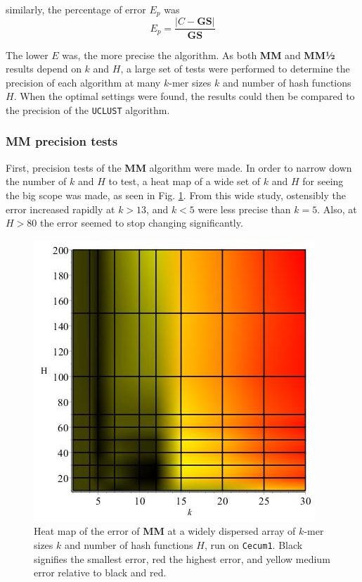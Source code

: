 \documentclass[../../main.tex]{subfiles}
\begin{document}
similarly, the percentage of error $E_p$ was 
\begin{equation}\label{eq:errorpercent}
E_p = \frac{|C - \mathbf{GS}|}{\mathbf{GS}}
\end{equation}


The lower $E$ was, the more precise the algorithm. As both {\bf MM} and {\bf MM½} results depend on $k$ and $H$, a large set of tests were performed to determine the precision of each algorithm at many $k$-mer sizes $k$ and number of hash functions $H$. When the optimal settings were found, the results could then be compared to the precision of the \texttt{UCLUST} algorithm. 
\subsubsection{MM precision tests}
First, precision tests of the {\bf MM} algorithm were made. In order to narrow down the number of $k$ and $H$ to test, a heat map of a wide set of $k$ and $H$ for seeing the big scope was made, as seen in Fig. \ref{fig:wideCminmax}. From this wide study, ostensibly the error increased rapidly at $k>13$, and $k<5$ were less precise than $k=5$. Also, at $H>80$ the error seemed to stop changing significantly.

\begin{figure}[H]
\centering
\includegraphics[scale=0.5]{precision/minmax/cecum1wide.jpg}
\caption{Heat map of the error of {\bf MM} at a widely dispersed array of $k$-mer sizes $k$ and number of hash functions $H$, run on \texttt{Cecum1}. Black signifies the smallest error, red the highest error, and yellow medium error relative to black and red.}\label{fig:wideCminmax}
\end{figure}
\end{document}
